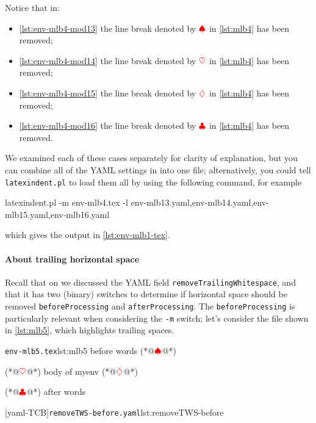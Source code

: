 		Notice that in:
		\begin{itemize}
			\item \cref{lst:env-mlb4-mod13} the line break denoted by $\color{red}\spadesuit$ in
			      \cref{lst:mlb4} has been removed;
			\item \cref{lst:env-mlb4-mod14} the line break denoted by $\color{red}\heartsuit$ in
			      \cref{lst:mlb4} has been removed;
			\item \cref{lst:env-mlb4-mod15} the line break denoted by $\color{red}\diamondsuit$ in
			      \cref{lst:mlb4} has been removed;
			\item \cref{lst:env-mlb4-mod16} the line break denoted by $\color{red}\clubsuit$ in
			      \cref{lst:mlb4} has been removed.
		\end{itemize}
		We examined each of these cases separately for clarity of explanation, but you can
		combine all of the YAML settings in  into one
		file; alternatively, you could tell \texttt{latexindent.pl} to load them all by using the
		following command, for example
		\begin{widepage}
			\begin{commandshell}
latexindent.pl -m env-mlb4.tex -l env-mlb13.yaml,env-mlb14.yaml,env-mlb15.yaml,env-mlb16.yaml
\end{commandshell}
		\end{widepage}
		which gives the output in \vref{lst:env-mlb1-tex}.

	\paragraph{About trailing horizontal space}
		Recall that on  we discussed the YAML field
		\texttt{removeTrailingWhitespace}, and that it has two (binary) switches to determine if
		horizontal space should be removed \texttt{beforeProcessing} and
		\texttt{afterProcessing}. The \texttt{beforeProcessing} is particularly relevant when
		considering the \texttt{-m} switch; let's consider the file shown in \cref{lst:mlb5},
		which highlights trailing spaces.

		\begin{cmhtcbraster}
			\begin{cmhlistings}[style=tcblatex,showspaces=true,escapeinside={(*@}{@*)}]{\texttt{env-mlb5.tex}}{lst:mlb5}
before words   (*@$\color{red}\spadesuit$@*) 
\begin{myenv}           (*@$\color{red}\heartsuit$@*)
body of myenv      (*@$\color{red}\diamondsuit$@*) 
\end{myenv}     (*@$\color{red}\clubsuit$@*)
after words
\end{cmhlistings}
			[yaml-TCB]{\texttt{removeTWS-before.yaml}}{lst:removeTWS-before}
		\end{cmhtcbraster}

